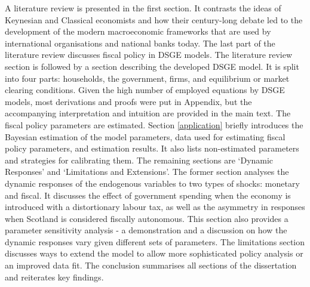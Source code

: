 A literature review is presented in the first section. It contrasts the ideas of Keynesian and Classical economists and how their century-long debate led to the development of the modern macroeconomic frameworks that are used by international organisations and national banks today. The last part of the literature review discusses fiscal policy in DSGE models. The literature review section is followed by a section describing the developed DSGE model. It is split into four parts: households, the government, firms, and equilibrium or market clearing conditions. Given the high number of employed equations by DSGE models, most derivations and proofs were put in Appendix, but the accompanying interpretation and intuition are provided in the main text. The fiscal policy parameters are estimated. Section \ref{application} briefly introduces the Bayesian estimation of the model parameters, data used for estimating fiscal policy parameters, and estimation results. It also lists non-estimated parameters and strategies for calibrating them. The remaining sections are `Dynamic Responses' and `Limitations and Extensions'. The former section analyses the dynamic responses of the endogenous variables to two types of shocks: monetary and fiscal. It discusses the effect of government spending when the economy is introduced with a distortionary labour tax, as well as the asymmetry in responses when Scotland is considered fiscally autonomous. This section also provides a parameter sensitivity analysis - a demonstration and a discussion on how the dynamic responses vary given different sets of parameters. The limitations section discusses ways to extend the model to allow more sophisticated policy analysis or an improved data fit. The conclusion summarises all sections of the dissertation and reiterates key findings.